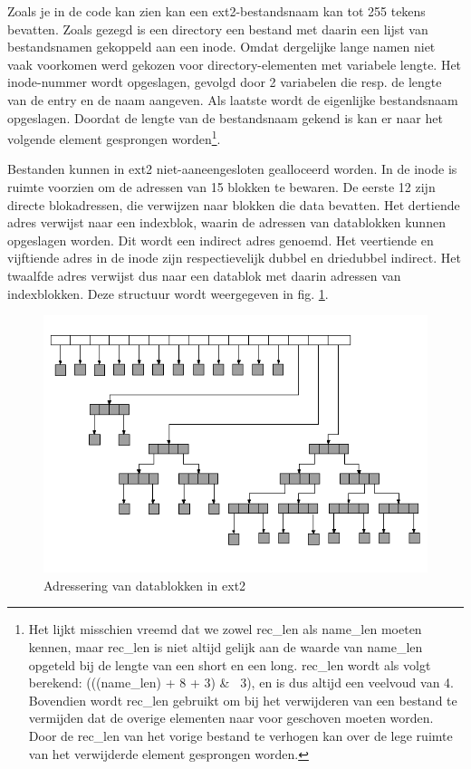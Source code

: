 Zoals je in de code kan zien kan een ext2-bestandsnaam kan tot 255 tekens bevatten. Zoals gezegd is
een directory een bestand met daarin een lijst van bestandsnamen gekoppeld aan een inode. Omdat dergelijke
lange namen niet vaak voorkomen werd gekozen voor directory-elementen met variabele lengte. Het inode-nummer
wordt opgeslagen, gevolgd door 2 variabelen die resp. de lengte van de entry en de naam aangeven. Als laatste
wordt de eigenlijke bestandsnaam opgeslagen. Doordat de lengte van de bestandsnaam gekend is kan er
naar het volgende element gesprongen worden\footnote{Het lijkt misschien vreemd dat we zowel
rec\_len als name\_len moeten kennen, maar rec\_len is niet altijd gelijk aan de waarde van name\_len
opgeteld bij de lengte van een short en een long. rec\_len wordt als volgt berekend:
(((name\_len) + 8 + 3) \& ~3), en is dus altijd een veelvoud van 4. Bovendien wordt rec\_len
gebruikt om bij het verwijderen van een bestand te vermijden dat de overige elementen naar voor
geschoven moeten worden. Door de rec\_len van het vorige bestand te verhogen kan over de lege
ruimte van het verwijderde element gesprongen worden.}.

Bestanden kunnen in ext2 niet-aaneengesloten gealloceerd worden. In de inode is ruimte voorzien om de
adressen van 15 blokken te bewaren. De eerste 12 zijn directe blokadressen, die verwijzen naar blokken
die data bevatten. Het dertiende adres verwijst naar een indexblok, waarin de adressen van datablokken kunnen
opgeslagen worden. Dit wordt een indirect adres genoemd. Het veertiende en vijftiende adres in de inode
zijn respectievelijk dubbel en driedubbel indirect. Het twaalfde adres verwijst dus naar een datablok met
daarin adressen van indexblokken. Deze structuur wordt weergegeven in fig. \ref{extAdressering}.

\begin{figure}
\begin{center}
\includegraphics[width=120mm]{images/fig0419.png}
\caption{Adressering van datablokken in ext2}
\label{extAdressering}
\end{center}
\end{figure}

